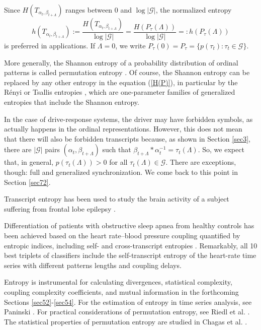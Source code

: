 \documentclass[%
 aip,
 amsmath,amssymb,
 reprint,%
]{revtex4-1}
\begin{document}
Since $H(T_{\alpha _{t},\beta _{t+\Lambda }})$ ranges between $0$ and $\log \left\vert \mathcal{G}\right\vert $,
the normalized entropy%
\begin{equation}
h(T_{\alpha _{t},\beta _{t+\Lambda }}):=\frac{H(T_{\alpha _{t},\beta
_{t+\Lambda }})}{\log \left\vert \mathcal{G}\right\vert }=\frac{H(P_{\tau
}(\Lambda ))}{\log \left\vert \mathcal{G}\right\vert }=:h(P_{\tau }(\Lambda ))
\label{normalized H}
\end{equation}%
is preferred in applications. If $\Lambda =0$, we write $P_{\tau
}(0)=P_{\tau }=\{p(\tau _{t}):\tau _{t}\in \mathcal{G}\}$.

More generally, the Shannon entropy of a probability distribution of ordinal
patterns is called permutation entropy \cite{Bandt2002,Amigo2013}. Of
course, the Shannon entropy can be replaced by any other entropy in the
equation (\ref{H(P)}), in particular by the R\'{e}nyi or Tsallis entropies 
\cite{Renyi1961,Tsallis1988}, which are one-parameter families of
generalized entropies that include the Shannon entropy.

In the case of drive-response systems, the driver may have forbidden
symbols, as actually happens in the ordinal representations. However, this
does not mean that there will also be forbidden transcripts because, as
shown in Section \ref{sec3}, there are $\left\vert \mathcal{G}\right\vert $
pairs $(\alpha _{t},\beta _{t+\Lambda })$ such that $\beta _{t+\Lambda }\ast
\alpha _{t}^{-1}=\tau _{t}(\Lambda ).$ So, we expect that, in general, $%
p(\tau _{t}(\Lambda ))>0$ for all $\tau _{t}(\Lambda )\in \mathcal{G}$.
There are exceptions, though: full and generalized synchronization. We come
back to this point in Section \ref{sec72}.

Transcript entropy has been used to study the brain activity of a subject
suffering from frontal lobe epilepsy \cite{Amigo2012}.

Differentiation of patients with obstructive sleep apnea from healthy
controls has been achieved based on the heart rate--blood pressure coupling
quantified by entropic indices, including self- and cross-transcript
entropies \cite{Pilarczyk2023}. Remarkably, all 10 best triplets of
classifiers include the self-transcript entropy of the heart-rate time series with different patterns lengths and coupling delays.

Entropy is instrumental for calculating divergences, statistical
complexity, coupling complexity coefficients, and mutual information in the
forthcoming Sections \ref{sec52}-\ref{sec54}. For the estimation of entropy
in time series analysis, see Paninski \cite{Paninski2003}. For practical
considerations of permutation entropy, see Riedl et al. \cite{Riedl2013}.
The statistical properties of permutation entropy are studied in Chagas et
al. \cite{Chagas2022}.
\end{document}
